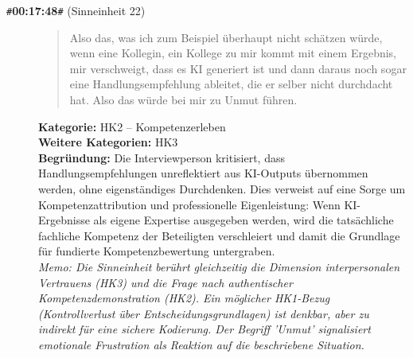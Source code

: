 \begin{description}
  \item[\texttt{\#}\textbf{00:17:48}\texttt{\#} (Sinneinheit 22)]
  \begin{quote}
  Also das, was ich zum Beispiel überhaupt nicht schätzen würde, wenn eine Kollegin, ein Kollege zu mir kommt mit einem Ergebnis, mir verschweigt, dass es KI generiert ist und dann daraus noch sogar eine Handlungsempfehlung ableitet, die er selber nicht durchdacht hat. Also das würde bei mir zu Unmut führen.
  \end{quote}
  \textbf{Kategorie:} HK2 -- Kompetenzerleben\\
  \textbf{Weitere Kategorien:} HK3\\
  \textbf{Begr\"undung:} Die Interviewperson kritisiert, dass Handlungsempfehlungen unreflektiert aus KI-Outputs übernommen werden, ohne eigenständiges Durchdenken. Dies verweist auf eine Sorge um Kompetenzattribution und professionelle Eigenleistung: Wenn KI-Ergebnisse als eigene Expertise ausgegeben werden, wird die tatsächliche fachliche Kompetenz der Beteiligten verschleiert und damit die Grundlage für fundierte Kompetenzbewertung untergraben.
  \\\textit{Memo: Die Sinneinheit berührt gleichzeitig die Dimension interpersonalen Vertrauens (HK3) und die Frage nach authentischer Kompetenzdemonstration (HK2). Ein möglicher HK1-Bezug (Kontrollverlust über Entscheidungsgrundlagen) ist denkbar, aber zu indirekt für eine sichere Kodierung. Der Begriff 'Unmut' signalisiert emotionale Frustration als Reaktion auf die beschriebene Situation.}
\end{description}
\medskip

